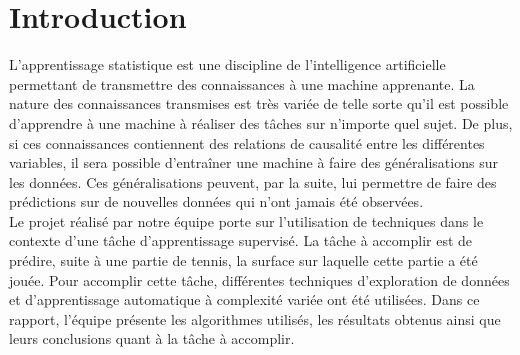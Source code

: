 \section{Introduction}

L'apprentissage statistique est une discipline de l'intelligence artificielle permettant de transmettre des connaissances à une machine apprenante. La nature des connaissances transmises est très variée de telle sorte qu'il est possible d'apprendre à une machine à réaliser des tâches sur n'importe quel sujet. De plus, si ces connaissances contiennent des relations de causalité entre les différentes variables, il sera possible d'entraîner une machine à faire des généralisations sur les données. Ces généralisations peuvent, par la suite, lui permettre de faire des prédictions sur de nouvelles données qui n'ont jamais été observées.\\

Le projet réalisé par notre équipe porte sur l'utilisation de techniques dans le contexte d'une tâche d'apprentissage supervisé. La tâche à accomplir est de prédire, suite à une partie de tennis, la surface sur laquelle cette partie a été jouée.  Pour accomplir cette tâche, différentes techniques d'exploration de données et d'apprentissage automatique à complexité variée ont été utilisées.  Dans ce rapport, l'équipe présente les algorithmes utilisés, les résultats obtenus ainsi que leurs conclusions quant à la tâche à accomplir.

